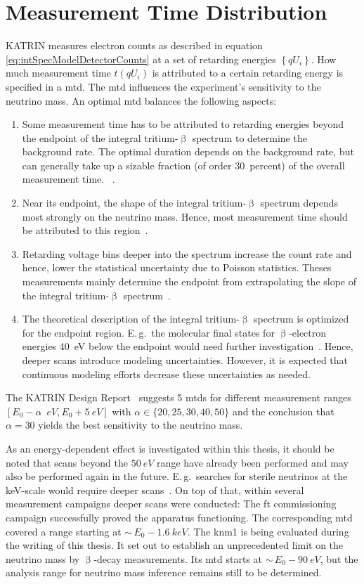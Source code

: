 \section{Measurement Time Distribution}
\label{sec:intSpecModelMTD}
KATRIN measures electron counts as described in equation \eqref{eq:intSpecModelDetectorCounts} at a set of retarding energies $\left\{qU_i\right\}$. How much measurement time $t(qU_i)$ is attributed to a certain retarding energy is specified in a \gls{mtd}. The \gls{mtd} influences the experiment's sensitivity to the neutrino mass. An optimal \gls{mtd} balances the following aspects:
\begin{enumerate}
	\item Some measurement time has to be attributed to retarding energies beyond the endpoint of the integral tritium-$\upbeta$ spectrum to determine the background rate. The optimal duration depends on the background rate, but can generally take up a sizable fraction (of order \SI{30}{percent}) of the overall measurement time. ~\cite{Angrik:2005ep}.
	\item Near its endpoint, the shape of the integral tritium-$\upbeta$ spectrum depends most strongly on the neutrino mass. Hence, most measurement time should be attributed to this region~\cite{Angrik:2005ep}.
	\item Retarding voltage bins deeper into the spectrum increase the count rate and hence, lower the statistical uncertainty due to Poisson statistics. Theses measurements mainly determine the endpoint from extrapolating the slope of the integral tritium-$\upbeta$ spectrum~\cite{Angrik:2005ep}.
	\item The theoretical description of the integral tritium-$\upbeta$ spectrum is optimized for the endpoint region. E.\,g.~the molecular final states for $\upbeta$-electron energies \SI{40}{eV} below the endpoint would need further investigation~\cite{Doss:2006}. Hence, deeper scans introduce modeling uncertainties. However, it is expected that continuous modeling efforts decrease these uncertainties as needed.
\end{enumerate}
The KATRIN Design Report~\cite{Angrik:2005ep} suggests 5 \gls{mtd}s for different measurement ranges $[E_0-\alpha\;\SI{}{eV}, E_0 + \SI{5}{eV}]$ with $\alpha \in \{20, 25, 30, 40, 50\}$ and the conclusion that $\alpha=30$ yields the best sensitivity to the neutrino mass.

As an energy-dependent effect is investigated within this thesis, it should be noted that scans beyond the $\SI{50}{eV}$ range have already been performed and may also be performed again in the future. E.\,g.~searches for sterile neutrinos at the keV-scale would require deeper scans~\cite{Mertens2019}. On top of that, within several measurement campaigns deeper scans were conducted: The \gls{ft} commissioning campaign successfully proved the apparatus functioning. The corresponding \gls{mtd} covered a range starting at $\sim\,E_0-\SI{1.6}{keV}$. The \gls{knm1} is being evaluated during the writing of this thesis. It set out to establish an unprecedented limit on the neutrino mass by $\upbeta$-decay measurements. Its \gls{mtd} starts at $\sim\,E_0-\SI{90}{eV}$, but the analysis range for neutrino mass inference remains still to be determined.


